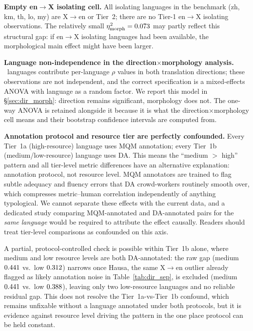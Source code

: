 \documentclass[11pt]{article}
\begin{document}
\textbf{Empty en$\to$X isolating cell.} All isolating languages in the benchmark (zh, km, th, lo, my) are X$\to$en or Tier~2; there are no Tier-1 en$\to$X isolating observations. The relatively small $\eta^2_{\text{morph}}=0.073$ may partly reflect this structural gap: if en$\to$X isolating languages had been available, the morphological main effect might have been larger.

\textbf{Language non-independence in the direction$\times$morphology analysis.} \NumMixedLangs\ languages contribute per-language $\rho$ values in both translation directions; these observations are not independent, and the correct specification is a mixed-effects ANOVA with language as a random factor. We report this model in \S\ref{sec:dir_morph}: direction remains significant, morphology does not. The one-way ANOVA is retained alongside it because it is what the direction$\times$morphology cell means and their bootstrap confidence intervals are computed from.

\textbf{Annotation protocol and resource tier are perfectly confounded.} Every Tier~1a (high-resource) language uses MQM annotation; every Tier~1b (medium/low-resource) language uses DA. This means the ``medium $>$ high'' pattern and all tier-level metric differences have an alternative explanation: annotation protocol, not resource level. MQM annotators are trained to flag subtle adequacy and fluency errors that DA crowd-workers routinely smooth over, which compresses metric--human correlation independently of anything typological. We cannot separate these effects with the current data, and a dedicated study comparing MQM-annotated and DA-annotated pairs for the \emph{same language} would be required to attribute the effect causally. Readers should treat tier-level comparisons as confounded on this axis.

A partial, protocol-controlled check is possible within Tier~1b alone, where medium and low resource levels are both DA-annotated: the raw gap (medium $0.441$ vs.\ low $0.312$) narrows once Hausa, the same X$\to$en outlier already flagged as likely annotation noise in Table~\ref{tab:dir_sep}, is excluded (medium $0.441$ vs.\ low $0.388$), leaving only two low-resource languages and no reliable residual gap. This does not resolve the Tier~1a-vs-Tier~1b confound, which remains unfixable without a language annotated under both protocols, but it is evidence against resource level driving the pattern in the one place protocol can be held constant.
\end{document}
